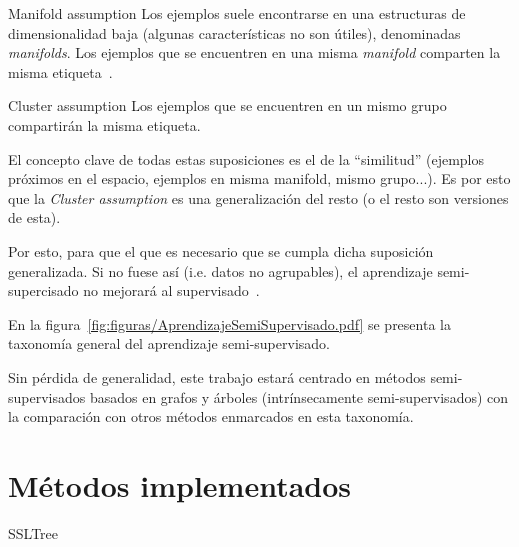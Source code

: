 \medskip

\begin{mainbox}{Manifold assumption}
    Los ejemplos suele encontrarse en una estructuras de dimensionalidad baja (algunas características
    no son útiles), denominadas \emph{manifolds}. Los ejemplos que se encuentren en una misma \emph{manifold} comparten la misma etiqueta~\cite{towardsdatascience:semi,vanEngelen2020}.
\end{mainbox}

\medskip

\begin{mainbox}{Cluster assumption}
    Los ejemplos que se encuentren en un mismo grupo compartirán la misma etiqueta.
\end{mainbox}


El concepto clave de todas estas suposiciones es el de la ``similitud'' 
(ejemplos próximos en el espacio, ejemplos en misma manifold, mismo grupo...). 
Es por esto que la \textit{Cluster assumption} es una generalización del
resto (o el resto son versiones de esta).

Por esto, para que el que 
es necesario que se cumpla dicha suposición generalizada. Si no fuese así (i.e. datos no agrupables),
el aprendizaje semi-supercisado no mejorará al supervisado~\cite{vanEngelen2020}.


En la figura~\ref{fig:figuras/AprendizajeSemiSupervisado.pdf} se presenta la taxonomía general del aprendizaje semi-supervisado.


Sin pérdida de generalidad, este trabajo estará centrado en métodos semi-supervisados basados en grafos y árboles (intrínsecamente semi-supervisados) con la comparación con otros métodos enmarcados en esta taxonomía.

\clearpage
\section{Métodos implementados}

SSLTree